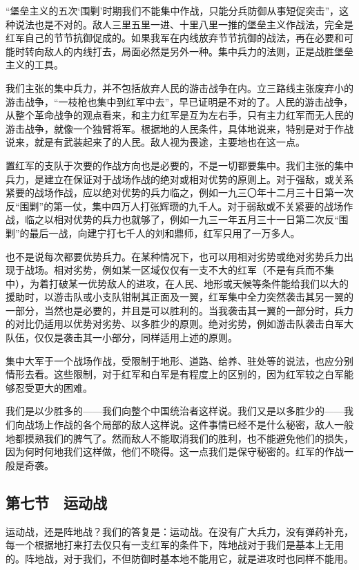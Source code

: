 “堡垒主义的五次‘围剿’时期我们不能集中作战，只能分兵防御从事短促突击”，这种说法也是不对的。敌人三里五里一进、十里八里一推的堡垒主义作战法，完全是红军自己的节节抗御促成的。如果我军在内线放弃节节抗御的战法，再在必要和可能时转向敌人的内线打去，局面必然是另外一种。集中兵力的法则，正是战胜堡垒主义的工具。

我们主张的集中兵力，并不包括放弃人民的游击战争在内。立三路线主张废弃小的游击战争，“一枝枪也集中到红军中去”，早已证明是不对的了。人民的游击战争，从整个革命战争的观点看来，和主力红军是互为左右手，只有主力红军而无人民的游击战争，就像一个独臂将军。根据地的人民条件，具体地说来，特别是对于作战说来，就是有武装起来了的人民。敌人视为畏途，主要地也在这一点。

置红军的支队于次要的作战方向也是必要的，不是一切都要集中。我们主张的集中兵力，是建立在保证对于战场作战的绝对或相对优势的原则上。对于强敌，或关系紧要的战场作战，应以绝对优势的兵力临之，例如一九三〇年十二月三十日第一次反“围剿”的第一仗，集中四万人打张辉瓒的九千人。对于弱敌或不关紧要的战场作战，临之以相对优势的兵力也就够了，例如一九三一年五月三十一日第二次反“围剿”的最后一战，向建宁打七千人的刘和鼎师，红军只用了一万多人。

也不是说每次都要优势兵力。在某种情况下，也可以用相对劣势或绝对劣势兵力出现于战场。相对劣势，例如某一区域仅仅有一支不大的红军（不是有兵而不集中），为着打破某一优势敌人的进攻，在人民、地形或天候等条件能给我们以大的援助时，以游击队或小支队钳制其正面及一翼，红军集中全力突然袭击其另一翼的一部分，当然也是必要的，并且是可以胜利的。当我袭击其一翼的一部分时，兵力的对比仍适用以优势对劣势、以多胜少的原则。绝对劣势，例如游击队袭击白军大队伍，仅仅是袭击其一小部分，同样适用上述的原则。

集中大军于一个战场作战，受限制于地形、道路、给养、驻处等的说法，也应分别情形去看。这些限制，对于红军和白军是有程度上的区别的，因为红军较之白军能够忍受更大的困难。

我们是以少胜多的——我们向整个中国统治者这样说。我们又是以多胜少的——我们向战场上作战的各个局部的敌人这样说。这件事情已经不是什么秘密，敌人一般地都摸熟我们的脾气了。然而敌人不能取消我们的胜利，也不能避免他们的损失，因为何时何地我们这样做，他们不晓得。这一点我们是保守秘密的。红军的作战一般是奇袭。

\subsection{第七节　运动战}

运动战，还是阵地战？我们的答复是：运动战。在没有广大兵力，没有弹药补充，每一个根据地打来打去仅只有一支红军的条件下，阵地战对于我们是基本上无用的。阵地战，对于我们，不但防御时基本地不能用它，就是进攻时也同样不能用。

